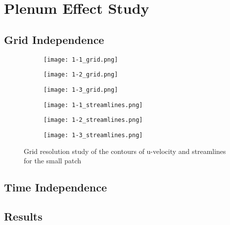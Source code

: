 \section{Plenum Effect Study}


\subsection{Grid Independence}


\begin{figure}[tbp] \centering
\begin{subfigure}{.32\textwidth} \centering
  \texttt{[image: 1-1\_grid.png]}
\end{subfigure}%
\begin{subfigure}{.32\textwidth} \centering
  \texttt{[image: 1-2\_grid.png]}
\end{subfigure}%
\begin{subfigure}{.32\textwidth} \centering
  \texttt{[image: 1-3\_grid.png]}
\end{subfigure}
\begin{subfigure}{.32\textwidth} \centering
  \texttt{[image: 1-1\_streamlines.png]}
\end{subfigure}%
\begin{subfigure}{.32\textwidth} \centering
  \texttt{[image: 1-2\_streamlines.png]}
\end{subfigure}%
\begin{subfigure}{.32\textwidth} \centering
  \texttt{[image: 1-3\_streamlines.png]}
\end{subfigure}
  \caption{Grid resolution study of the contours of u-velocity and streamlines for the small patch}
  \label{fig:small}
\end{figure}

\subsection{Time Independence}

\subsection{Results}
